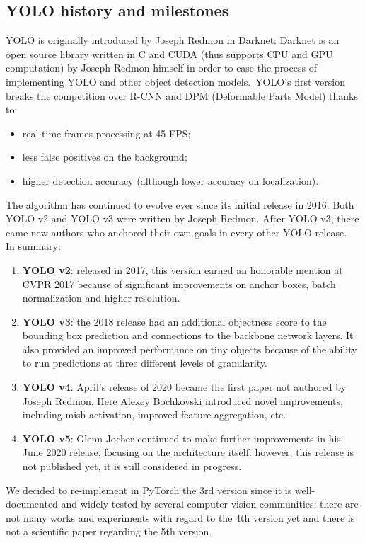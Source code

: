 \documentclass[../report.tex]{subfiles}
\begin{document}
\subsection{YOLO history and milestones}\label{ss:yolo-history}
YOLO is originally introduced by Joseph Redmon in Darknet: Darknet is an open source library written in C and CUDA (thus supports CPU and GPU computation) by Joseph Redmon himself in order to ease the process of implementing YOLO and other object detection models.\
YOLO’s first version breaks the competition over R-CNN and DPM (Deformable Parts Model) thanks to:
\begin{itemize}
	\item real-time frames processing at 45 FPS;
	\item less false positives on the background;
	\item higher detection accuracy (although lower accuracy on localization).
\end{itemize}
\noindent
The algorithm has continued to evolve ever since its initial release in 2016. Both YOLO v2 and YOLO v3 were written by Joseph Redmon. After YOLO v3, there came new authors who anchored their own goals in every other YOLO release.\\
\noindent
In summary:
\begin{enumerate}
	\item \textbf{YOLO v2}: released in 2017, this version earned an honorable mention at CVPR 2017 because of significant improvements on anchor boxes, batch normalization and higher resolution.
	\item \textbf{YOLO v3}: the 2018 release had an additional objectness score to the bounding box prediction and connections to the backbone network layers. It also provided an improved performance on tiny objects because of the ability to run predictions at three different levels of granularity.
	\item \textbf{YOLO v4}: April’s release of 2020 became the first paper not authored by Joseph Redmon. Here Alexey Bochkovski introduced novel improvements, including mish activation, improved feature aggregation, etc.
	\item \textbf{YOLO v5}: Glenn Jocher continued to make further improvements in his June 2020 release, focusing on the architecture itself: however, this release is not published yet, it is still considered in progress.
\end{enumerate}
\noindent
We decided to re-implement in PyTorch the 3rd version since it is well-documented and widely tested by several computer vision communities: there are not many works and experiments with regard to the 4th version yet and there is not a scientific paper regarding the 5th version.
\end{document}
